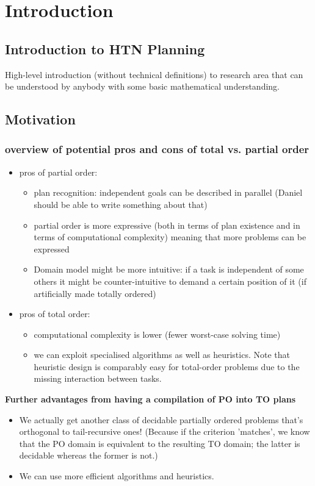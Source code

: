 \chapter{Introduction}

\section{Introduction to HTN Planning}
High-level introduction (without technical definitions) to research area that can be understood by anybody with some basic mathematical understanding.  

\section{Motivation}

\subsection{overview of potential pros and cons of total vs. partial order}
\begin{itemize}
	\item pros of partial order:
	\begin{itemize}
		\item plan recognition: independent goals can be described in parallel (Daniel should be able to write something about that)
		\item partial order is more expressive (both in terms of plan existence and in terms of computational complexity) meaning that more problems can be expressed
		\item Domain model might be more intuitive: if a task is independent of some others it might be counter-intuitive to demand a certain position of it (if artificially made totally ordered)
	\end{itemize}

   \item pros of total order:
    \begin{itemize}
   		\item computational complexity is lower (fewer worst-case solving time)
        \item we can exploit specialised algorithms as well as heuristics. Note that heuristic design is comparably easy for total-order problems due to the missing interaction between tasks.
   	\end{itemize}
\end{itemize}


\textbf{Further advantages from having a compilation of PO into TO plans}
\begin{itemize}
	\item We actually get another class of decidable partially ordered problems that's orthogonal to tail-recursive ones! (Because if the criterion 'matches', we know that the PO domain is equivalent to the resulting TO domain; the latter is decidable whereas the former is not.) 
	\item We can use more efficient algorithms and heuristics. 
\end{itemize}

